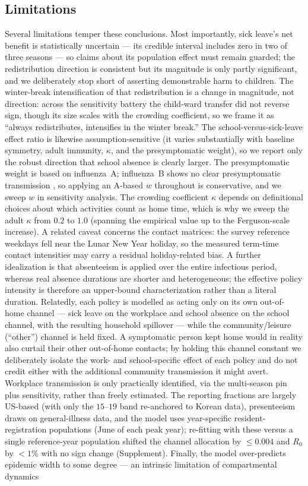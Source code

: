 \documentclass[12pt]{article}
\theoremstyle{plain}
\theoremstyle{remark}
\theoremstyle{definition}
\begin{document}
\subsection{Limitations}
Several limitations temper these conclusions. Most importantly, sick leave's net benefit is statistically uncertain --- its credible interval includes zero in two of three seasons --- so claims about its population effect must remain guarded; the redistribution direction is consistent but its magnitude is only partly significant, and we deliberately stop short of asserting demonstrable harm to children. The winter-break intensification of that redistribution is a change in magnitude, not direction: across the sensitivity battery the child-ward transfer did not reverse sign, though its size scales with the crowding coefficient, so we frame it as ``always redistributes, intensifies in the winter break.'' The school-versus-sick-leave effect ratio is likewise assumption-sensitive (it varies substantially with baseline symmetry, adult immunity, $\kappa$, and the presymptomatic weight), so we report only the robust direction that school absence is clearly larger. The presymptomatic weight is based on influenza~A; influenza~B shows no clear presymptomatic transmission \cite{NatureHealth2026}, so applying an A-based $w$ throughout is conservative, and we sweep $w$ in sensitivity analysis. The crowding coefficient $\kappa$ depends on definitional choices about which activities count as home time, which is why we sweep the adult $\kappa$ from $0.2$ to $1.0$ (spanning the empirical value up to the Ferguson-scale increase). A related caveat concerns the contact matrices: the survey reference weekdays fell near the Lunar New Year holiday, so the measured term-time contact intensities may carry a residual holiday-related bias. A further idealization is that absenteeism is applied over the entire infectious period, whereas real absence durations are shorter and heterogeneous; the effective policy intensity is therefore an upper-bound characterization rather than a literal duration. Relatedly, each policy is modelled as acting only on its own out-of-home channel --- sick leave on the workplace and school absence on the school channel, with the resulting household spillover --- while the community/leisure (``other'') channel is held fixed. A symptomatic person kept home would in reality also curtail their other out-of-home contacts; by holding this channel constant we deliberately isolate the work- and school-specific effect of each policy and do not credit either with the additional community transmission it might avert. Workplace transmission is only practically identified, via the multi-season pin plus sensitivity, rather than freely estimated. The reporting fractions are largely US-based (with only the $15$--$19$ band re-anchored to Korean data), presenteeism draws on general-illness data, and the model uses year-specific resident-registration populations (June of each peak year); re-fitting with these versus a single reference-year population shifted the channel allocation by $\le 0.004$ and $R_0$ by $<1\%$ with no sign change (Supplement). Finally, the model over-predicts epidemic width to some degree --- an intrinsic limitation of compartmental dynamics 
\end{document}
